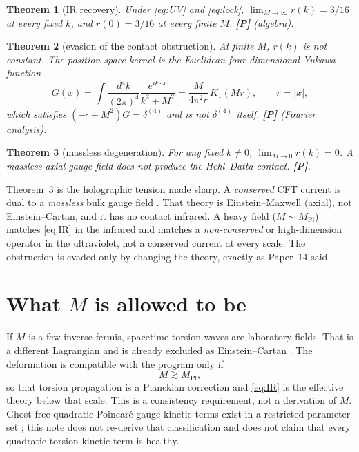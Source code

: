 \documentclass[11pt]{article}
\newtheorem{theorem}{Theorem}[section]
\theoremstyle{definition}
\newcommand{\pP}{\textbf{[P]}}
\begin{document}
\begin{theorem}[IR recovery]
\label{thm:ir}
Under \eqref{eq:UV} and \eqref{eq:lock},
$\lim_{M\to\infty}r(k)=3/16$ at every fixed $k$, and
$r(0)=3/16$ at every finite $M$. \pP{} (algebra).
\end{theorem}

\begin{theorem}[evasion of the contact obstruction]
\label{thm:nl}
At finite $M$, $r(k)$ is not constant. The position-space kernel
is the Euclidean four-dimensional Yukawa function
\begin{equation}
G(x)
=
\int\frac{d^4k}{(2\pi)^4}
\frac{e^{ik\cdot x}}{k^2+M^2}
=
\frac{M}{4\pi^2 r}\,K_1(Mr),
\qquad
r=\lvert x\rvert,
\label{eq:yuk}
\end{equation}
which satisfies $(-\square+M^2)G=\delta^{(4)}$ and is not
$\delta^{(4)}$ itself. \pP{} (Fourier analysis).
\end{theorem}

\begin{theorem}[massless degeneration]
\label{thm:m0}
For any fixed $k\neq 0$, $\lim_{M\to 0}r(k)=0$. A massless axial
gauge field does not produce the Hehl--Datta contact. \pP{}.
\end{theorem}

Theorem~\ref{thm:m0} is the holographic tension made sharp. A
\emph{conserved} CFT current is dual to a \emph{massless} bulk
gauge field \cite{Witten1998}. That theory is Einstein--Maxwell
(axial), not Einstein--Cartan, and it has no contact infrared.
A heavy field ($M\sim M_{\mathrm{Pl}}$) matches \eqref{eq:IR} in
the infrared and matches a \emph{non-conserved} or
high-dimension operator in the ultraviolet, not a conserved
current at every scale. The obstruction is evaded only by
changing the theory, exactly as Paper~14 said.

\section{What $M$ is allowed to be}

If $M$ is a few inverse fermis, spacetime torsion waves are
laboratory fields. That is a different Lagrangian and is already
excluded as Einstein--Cartan \cite{Hehl1976,Shapiro2002}. The
deformation is compatible with the program only if
\begin{equation}
M \gtrsim M_{\mathrm{Pl}},
\end{equation}
so that torsion propagation is a Planckian correction and
\eqref{eq:IR} is the effective theory below that scale. This is
a consistency requirement, not a derivation of $M$. Ghost-free
quadratic Poincar\'e-gauge kinetic terms exist in a restricted
parameter set \cite{Sezgin1980}; this note does not re-derive
that classification and does not claim that every quadratic
torsion kinetic term is healthy.
\end{document}
